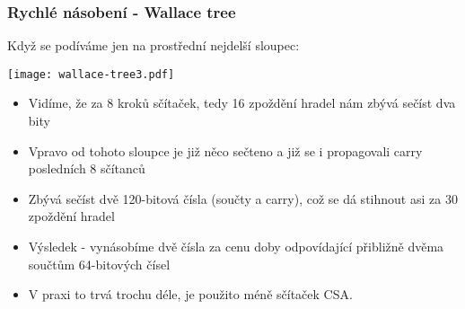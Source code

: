 \documentclass{beamer}
\begin{document}
\begin{frame}[shrink=5]
\frametitle{Rychlé násobení - Wallace tree}

Když se podíváme jen na prostřední nejdelší sloupec:
\begin{center}
\texttt{[image: wallace-tree3.pdf]}
\end{center}

\begin{itemize}
\item Vidíme, že za 8 kroků sčítaček, tedy 16 zpoždění hradel nám zbývá sečíst dva bity
\item Vpravo od tohoto sloupce je již něco sečteno a již se i propagovali carry posledních 8 sčítanců
\item Zbývá sečíst dvě 120-bitová čísla (součty a carry), což se dá stihnout asi za 30 zpoždění hradel
\item Výsledek - vynásobíme dvě čísla za cenu doby odpovídající přibližně dvěma součtům 64-bitových čísel
\item V praxi to trvá trochu déle, je použito méně sčítaček CSA. 
\end{itemize}

\end{frame}
\end{document}
